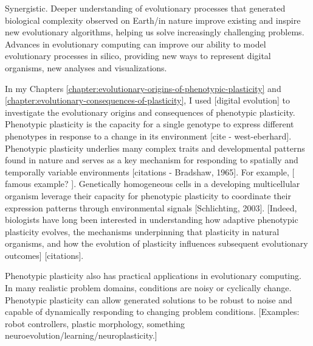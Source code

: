 Synergistic.
Deeper understanding of evolutionary processes that generated biological complexity observed on Earth/in nature improve existing and inspire new evolutionary algorithms, helping us solve increasingly challenging problems.
Advances in evolutionary computing can improve our ability to model evolutionary processes in silico, providing new ways to represent digital organisms, new analyses and visualizations. 

In my Chapters \ref{chapter:evolutionary-origins-of-phenotypic-plasticity} and \ref{chapter:evolutionary-consequences-of-plasticity}, I used [digital evolution] to investigate the evolutionary origins and consequences of phenotypic plasticity.
Phenotypic plasticity is the capacity for a single genotype to express different phenotypes in response to a change in its environment [cite - west-eberhard].
Phenotypic plasticity underlies many complex traits and developmental patterns found in nature and serves as a key mechanism for responding to spatially and temporally variable environments [citations - Bradshaw, 1965].
For example, [ famous example? ].
Genetically homogeneous cells in a developing multicellular organism leverage their capacity for phenotypic plasticity to coordinate their expression patterns through environmental signals [Schlichting, 2003].
[Indeed, biologists have long been interested in understanding how adaptive phenotypic plasticity evolves, the mechanisms underpinning that plasticity in natural organisms, and how the evolution of plasticity influences subsequent evolutionary outcomes] [citations].

Phenotypic plasticity also has practical applications in evolutionary computing.
In many realistic problem domains, conditions are noisy or cyclically change.
Phenotypic plasticity can allow generated solutions to be robust to noise and capable of dynamically responding to changing problem conditions.
[Examples: robot controllers, plastic morphology, something neuroevolution/learning/neuroplasticity.]

